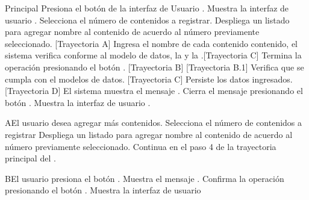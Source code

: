 \begin{UCtrayectoria}{Principal}
    \UCpaso[\UCactor] Presiona el botón  de la interfaz de Usuario .
    \UCpaso Muestra la interfaz de usuario .
    \UCpaso[\UCactor] Selecciona el número de contenidos a registrar.
    \UCpaso Despliega un listado para agregar nombre al contenido de acuerdo al número previamente seleccionado. [Trayectoria A]
    \UCpaso[\UCactor] Ingresa el nombre de cada contenido contenido, el sistema verifica conforme al modelo de datos, la  y la .[Trayectoria C]
	\UCpaso[\UCactor] Termina la operación presionando el botón . [Trayectoria B] [Trayectoria B.1]
	\UCpaso Verifica que se cumpla con el modelos de datos. [Trayectoria C]
	\UCpaso Persiste los datos ingresados. [Trayectoria D]
	\UCpaso El sistema muestra el mensaje .
	\UCpaso[\UCactor] Cierra el mensaje presionando el botón .
	\UCpaso Muestra la interfaz de usuario .
\end{UCtrayectoria}


\begin{UCtrayectoriaA}{A}{El usuario desea agregar más contenidos.}
    \UCpaso[\UCactor] Selecciona el número de contenidos a registrar
    \UCpaso Despliega un listado para agregar nombre al contenido de acuerdo al número previamente seleccionado.
    \UCpaso Continua en el paso 4 de la trayectoria principal del .

\end{UCtrayectoriaA}

\begin{UCtrayectoriaA}{B}{El usuario presiona el botón .}
	\UCpaso Muestra el mensaje .
	\UCpaso[\UCactor] Confirma la operación presionando el botón .
	\UCpaso Muestra la interfaz de usuario 
\end{UCtrayectoriaA}

